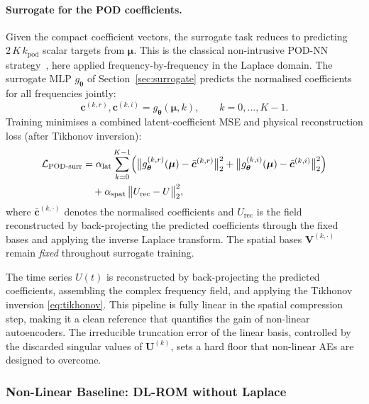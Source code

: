 ﻿\documentclass[a4paper,12pt]{article}
\theoremstyle{definition}
\theoremstyle{remark}
\newcommand{\vmu}{\bm{\mu}}
\begin{document}
\paragraph{Surrogate for the POD coefficients.}
Given the compact coefficient vectors, the surrogate task reduces to predicting $2\,K\,k_{\mathrm{pod}}$ scalar targets from $\vmu$. This is the classical non-intrusive POD-NN strategy~\cite{hesthaven2018}, here applied frequency-by-frequency in the Laplace domain. The surrogate MLP $g_{\bm{\theta}}$ of Section~\ref{sec:surrogate} predicts the normalised coefficients for all frequencies jointly:
\begin{equation}
    \bm{c}^{(k,r)}, \bm{c}^{(k,i)} = g_{\bm{\theta}}(\vmu, k), \qquad k = 0,\dots,K-1.
\end{equation}
Training minimises a combined latent-coefficient MSE and physical reconstruction loss (after Tikhonov inversion):
\begin{equation}
\begin{aligned}
    \mathcal{L}_{\mathrm{POD\text{-}surr}} &= \alpha_{\mathrm{lat}}\sum_{k=0}^{K-1}\Bigl(\bigl\|g_{\bm{\theta}}^{(k,r)}(\vmu) - \bar{\bm{c}}^{(k,r)}\bigr\|_2^2 + \bigl\|g_{\bm{\theta}}^{(k,i)}(\vmu) - \bar{\bm{c}}^{(k,i)}\bigr\|_2^2\Bigr) \\
    &\quad + \alpha_{\mathrm{spat}}\,\bigl\|U_{\mathrm{rec}} - U\bigr\|_2^2,
\end{aligned}
\end{equation}
where $\bar{\bm{c}}^{(k,\cdot)}$ denotes the normalised coefficients and $U_{\mathrm{rec}}$ is the field reconstructed by back-projecting the predicted coefficients through the fixed bases and applying the inverse Laplace transform. The spatial bases $\bm{V}^{(k,\cdot)}$ remain \emph{fixed} throughout surrogate training.

The time series $U(t)$ is reconstructed by back-projecting the predicted coefficients, assembling the complex frequency field, and applying the Tikhonov inversion \eqref{eq:tikhonov}. This pipeline is fully linear in the spatial compression step, making it a clean reference that quantifies the gain of non-linear autoencoders. The irreducible truncation error of the linear basis, controlled by the discarded singular values of $\bm{U}^{(k)}$, sets a hard floor that non-linear AEs are designed to overcome.

\subsubsection{Non-Linear Baseline: DL-ROM without Laplace}
\label{sec:dlrom_baseline}
\end{document}
